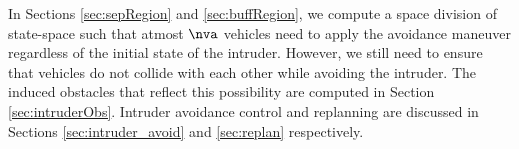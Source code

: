 In Sections \ref{sec:sepRegion} and \ref{sec:buffRegion}, we compute a space division of state-space such that atmost $\nva$ vehicles need to apply the avoidance maneuver regardless of the initial state of the intruder. However, we still need to ensure that vehicles do not collide with each other while avoiding the intruder. The induced obstacles that reflect this possibility are computed in Section \ref{sec:intruderObs}. Intruder avoidance control and replanning are discussed in Sections \ref{sec:intruder_avoid} and \ref{sec:replan} respectively.